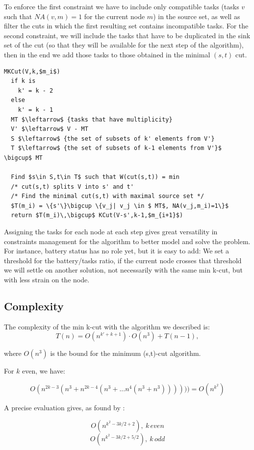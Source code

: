 To enforce the first constraint we have to include only compatible tasks (tasks $v$ such that $NA(v,m)=1$ for the current node $m$) in 
the source set, as well as filter the cuts in which the first resulting set contains incompatible tasks. For the second constraint, 
we will include the tasks that have to be duplicated in the sink set of the cut (so that they will be available for the next step 
of the algorithm), then in the end we add those tasks to those obtained in the minimal $(s,t)$ cut.
\lstset{numbers=left, mathescape=true, nolol=false,caption=Adapted min K-Cut,label=lst:mkcut}
\begin{lstlisting}
MKCut(V,k,$m_i$)
  if k is 
    k' = k - 2
  else
    k' = k - 1
  MT $\leftarrow$ {tasks that have multiplicity}
  V' $\leftarrow$ V - MT
  S $\leftarrow$ {the set of subsets of k' elements from V'}
  T $\leftarrow$ {the set of subsets of k-1 elements from V'}$ \bigcup$ MT

  Find $s\in S,t\in T$ such that W(cut(s,t)) = min
  /* cut(s,t) splits V into s' and t'
  /* Find the minimal cut(s,t) with maximal source set */
  $T(m_i) = \{s'\}\bigcup \{v_j| v_j \in $ MT$, NA(v_j,m_i)=1\}$
  return $T(m_i)\,\bigcup$ KCut(V-s',k-1,$m_{i+1}$)
\end{lstlisting}

Assigning the tasks for each node at each step gives great versatility in constraints management for the algorithm to better model and
solve the problem. For instance, battery status has no role yet, but it is easy to add: We set a threshold for the battery/tasks ratio,
if the current node crosses that threshold we will settle on another solution, not necessarily with the same min k-cut, but with less
strain on the node.

\subsection{Complexity}

The complexity of the min k-cut with the algorithm we described is:
\[T(n) = O(n^{k'+k+1}) \cdot O(n^3) + T(n-1), \]

where $O(n^3)$ is the bound for the minimum (s,t)-cut algorithm.

For $k$ even, we have:

\[O(n^{2k-3}(n^3 + n^{2k-4}(n^3 + ... n^4(n^3 + n^3)))))) = O (n^{k^2})\]

A precise evaluation gives, as found by \cite{Gold1988}:

\[O(n^{k^2 - 3k/2 + 2}),\:k\,even \]
\[O(n^{k^2 - 3k/2 + 5/2}),\:k\,odd \]

